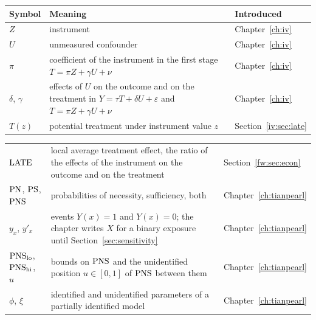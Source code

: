 {\noindent\small\centering
\setlength{\tabcolsep}{4pt}\renewcommand{\arraystretch}{1.1}
\begin{tabular}{>{\raggedright\arraybackslash}p{1.0in}>{\raggedright\arraybackslash}p{2.15in}>{\raggedright\arraybackslash}p{0.95in}}
\toprule
Symbol & Meaning & Introduced \\
\midrule
$Z$ & instrument & Chapter~\ref{ch:iv} \\
$U$ & unmeasured confounder & Chapter~\ref{ch:iv} \\
$\pi$ & coefficient of the instrument in the first stage $T = \pi Z + \gamma U + \nu$ & Chapter~\ref{ch:iv} \\
$\delta$, $\gamma$ & effects of $U$ on the outcome and on the treatment in $Y = \tau T + \delta U + \varepsilon$ and $T = \pi Z + \gamma U + \nu$ & Chapter~\ref{ch:iv} \\
$T(z)$ & potential treatment under instrument value $z$ & Section~\ref{iv:sec:late} \\
\end{tabular}\par}

{\noindent\small\centering
\setlength{\tabcolsep}{4pt}\renewcommand{\arraystretch}{1.1}
\begin{tabular}{>{\raggedright\arraybackslash}p{1.0in}>{\raggedright\arraybackslash}p{2.15in}>{\raggedright\arraybackslash}p{0.95in}}
$\mathrm{LATE}$ & local average treatment effect, the ratio of the effects of the instrument on the outcome and on the treatment & Section~\ref{fw:sec:econ} \\
$\mathrm{PN}$, $\mathrm{PS}$, $\mathrm{PNS}$ & probabilities of necessity, sufficiency, both & Chapter~\ref{ch:tianpearl} \\
$y_x$, $y'_x$ & events $Y(x) = 1$ and $Y(x) = 0$; the chapter writes $X$ for a binary exposure until Section~\ref{sec:sensitivity} & Chapter~\ref{ch:tianpearl} \\
$\mathrm{PNS}_{\mathrm{lo}}$, $\mathrm{PNS}_{\mathrm{hi}}$, $u$ & bounds on $\mathrm{PNS}$ and the unidentified position $u \in [0, 1]$ of $\mathrm{PNS}$ between them & Chapter~\ref{ch:tianpearl} \\
$\phi$, $\xi$ & identified and unidentified parameters of a partially identified model & Chapter~\ref{ch:tianpearl} \\
\end{tabular}\par}

